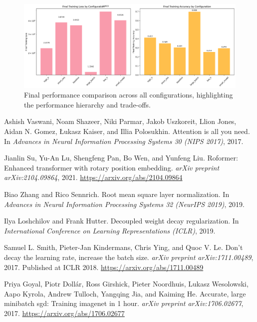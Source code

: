 \documentclass[11pt,a4paper]{article}
\begin{document}
\begin{figure}[H]
    \centering
    \includegraphics[width=\linewidth]{research/final_performance_comparison.png}
    \caption{Final performance comparison across all configurations, highlighting the performance hierarchy and trade-offs.}
    \label{fig:final_performance}
\end{figure}


\begin{thebibliography}{9}

Ashish Vaswani, Noam Shazeer, Niki Parmar, Jakob Uszkoreit, Llion Jones, Aidan N. Gomez, Łukasz Kaiser, and Illia Polosukhin.
\newblock Attention is all you need.
\newblock In \emph{Advances in Neural Information Processing Systems 30 (NIPS 2017)}, 2017.

Jianlin Su, Yu-An Lu, Shengfeng Pan, Bo Wen, and Yunfeng Liu.
\newblock Roformer: Enhanced transformer with rotary position embedding.
\newblock \emph{arXiv preprint arXiv:2104.09864}, 2021.
\newblock \url{https://arxiv.org/abs/2104.09864}

Biao Zhang and Rico Sennrich.
\newblock Root mean square layer normalization.
\newblock In \emph{Advances in Neural Information Processing Systems 32 (NeurIPS 2019)}, 2019.

Ilya Loshchilov and Frank Hutter.
\newblock Decoupled weight decay regularization.
\newblock In \emph{International Conference on Learning Representations (ICLR)}, 2019.

Samuel L. Smith, Pieter-Jan Kindermans, Chris Ying, and Quoc V. Le.
\newblock Don't decay the learning rate, increase the batch size.
\newblock \emph{arXiv preprint arXiv:1711.00489}, 2017.
\newblock Published at ICLR 2018. \url{https://arxiv.org/abs/1711.00489}

Priya Goyal, Piotr Dollár, Ross Girshick, Pieter Noordhuis, Lukasz Wesolowski, Aapo Kyrola, Andrew Tulloch, Yangqing Jia, and Kaiming He.
\newblock Accurate, large minibatch sgd: Training imagenet in 1 hour.
\newblock \emph{arXiv preprint arXiv:1706.02677}, 2017.
\newblock \url{https://arxiv.org/abs/1706.02677}

\end{thebibliography}
\end{document}
